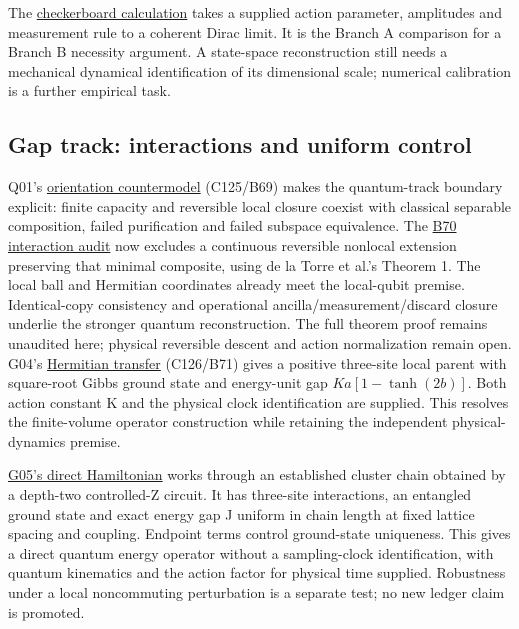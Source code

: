 \documentclass[11pt,a4paper]{article}
\begin{document}
The \href{../notes/checkerboard-dynamics.md}{checkerboard calculation}
takes a supplied action parameter, amplitudes and measurement rule to a
coherent Dirac limit. It is the Branch A comparison for a Branch B
necessity argument. A state-space reconstruction still needs a
mechanical dynamical identification of its dimensional scale; numerical
calibration is a further empirical task.

\hypertarget{gap-track-interactions-and-uniform-control}{%
\subsection{Gap track: interactions and uniform
control}\label{gap-track-interactions-and-uniform-control}}

Q01's \href{../notes/classical-orientation-closure.md}{orientation
countermodel} (C125/B69) makes the quantum-track boundary explicit:
finite capacity and reversible local closure coexist with classical
separable composition, failed purification and failed subspace
equivalence. The \href{../notes/classical-orientation-closure.md#reversible-operational-interaction-the-source-theorem}{B70
interaction audit} now excludes a continuous reversible nonlocal
extension preserving that minimal composite, using de la Torre et al.'s
Theorem 1. The local ball and Hermitian coordinates already meet the
local-qubit premise. Identical-copy consistency and operational
ancilla/measurement/discard closure underlie the stronger quantum
reconstruction. The full theorem proof remains unaudited here; physical
reversible descent and action normalization remain open. G04's
\href{../notes/interacting-ising-gap.md#the-square-root-gibbs-parent-and-its-local-terms}{Hermitian transfer}
(C126/B71) gives a positive three-site local parent with square-root
Gibbs ground state and energy-unit gap \(Ka[1-\tanh(2b)]\). Both action
constant K and the physical clock identification are supplied. This
resolves the finite-volume operator construction while retaining the
independent physical-dynamics premise.

\href{../notes/finite-depth-spin-gap.md}{G05's direct Hamiltonian} works
through an established cluster chain obtained by a depth-two
controlled-Z circuit. It has three-site interactions, an entangled
ground state and exact energy gap J uniform in chain length at fixed
lattice spacing and coupling. Endpoint terms control ground-state
uniqueness. This gives a direct quantum energy operator without a
sampling-clock identification, with quantum kinematics and the action
factor for physical time supplied. Robustness under a local noncommuting
perturbation is a separate test; no new ledger claim is promoted.
\end{document}

